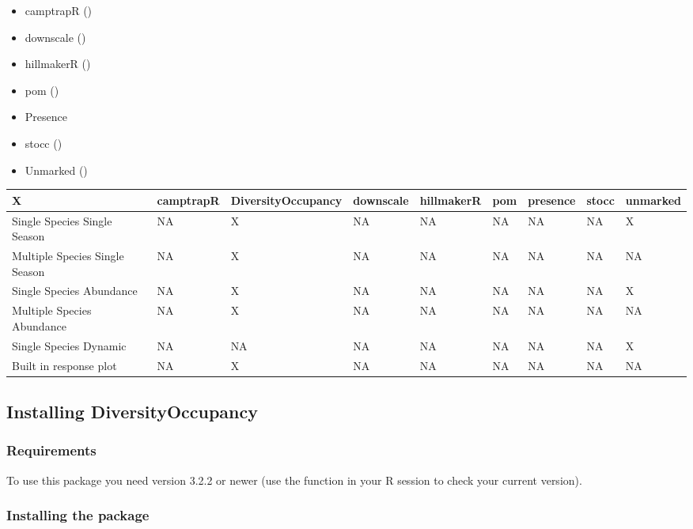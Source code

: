 \documentclass[article]{jss}
\providecommand{\tightlist}{%
  \setlength{\itemsep}{0pt}\setlength{\parskip}{0pt}}
\begin{document}
\begin{itemize}
\tightlist
\item
  camptrapR ()
\item
  downscale ()
\item
  hillmakerR ()
\item
  pom ()
\item
  Presence
\item
  stocc ()
\item
  Unmarked ()
\end{itemize}

\begin{tabular}{l|l|l|l|l|l|l|l|l}
\hline
X & camptrapR & DiversityOccupancy & downscale & hillmakerR & pom & presence & stocc & unmarked\\
\hline
Single Species Single Season & NA & X & NA & NA & NA & NA & NA & X\\
\hline
Multiple Species Single Season & NA & X & NA & NA & NA & NA & NA & NA\\
\hline
Single Species Abundance & NA & X & NA & NA & NA & NA & NA & X\\
\hline
Multiple Species Abundance & NA & X & NA & NA & NA & NA & NA & NA\\
\hline
Single Species Dynamic & NA & NA & NA & NA & NA & NA & NA & X\\
\hline
Built in response plot & NA & X & NA & NA & NA & NA & NA & NA\\
\hline
\end{tabular}

\subsection{Installing
DiversityOccupancy}\label{installing-diversityoccupancy}

\subsubsection{Requirements}\label{requirements}

To use this package you need  version 3.2.2 or newer (use
the function  in your R session to check your
current version).

\subsubsection{Installing the package}\label{installing-the-package}
\end{document}
